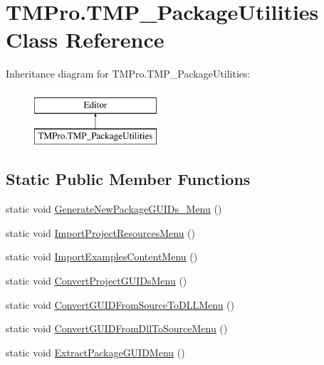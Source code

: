 \hypertarget{class_t_m_pro_1_1_t_m_p___package_utilities}{}\section{T\+M\+Pro.\+T\+M\+P\+\_\+\+Package\+Utilities Class Reference}
\label{class_t_m_pro_1_1_t_m_p___package_utilities}
Inheritance diagram for T\+M\+Pro.\+T\+M\+P\+\_\+\+Package\+Utilities\+:\begin{figure}[H]
\begin{center}
\leavevmode
\includegraphics[height=2.000000cm]{class_t_m_pro_1_1_t_m_p___package_utilities}
\end{center}
\end{figure}
\subsection*{Static Public Member Functions}
\begin{DoxyCompactItemize}
\item 
static void \mbox{\hyperlink{class_t_m_pro_1_1_t_m_p___package_utilities_ac893fee8fe15aa046c7d590006bbbdb8}{Generate\+New\+Package\+G\+U\+I\+Ds\+\_\+\+Menu}} ()
\item 
static void \mbox{\hyperlink{class_t_m_pro_1_1_t_m_p___package_utilities_a11f7e20b4617d90a5f1da630ed02b0dd}{Import\+Project\+Resources\+Menu}} ()
\item 
static void \mbox{\hyperlink{class_t_m_pro_1_1_t_m_p___package_utilities_aa73bd06e0ec78098db6c2d895bf8412e}{Import\+Examples\+Content\+Menu}} ()
\item 
static void \mbox{\hyperlink{class_t_m_pro_1_1_t_m_p___package_utilities_a049f2aee85c729a36286c8f57ed14a65}{Convert\+Project\+G\+U\+I\+Ds\+Menu}} ()
\item 
static void \mbox{\hyperlink{class_t_m_pro_1_1_t_m_p___package_utilities_a04787a4fc933d24280f8daf104208d39}{Convert\+G\+U\+I\+D\+From\+Source\+To\+D\+L\+L\+Menu}} ()
\item 
static void \mbox{\hyperlink{class_t_m_pro_1_1_t_m_p___package_utilities_a9ca977a668368d564883e9c34b261cb0}{Convert\+G\+U\+I\+D\+From\+Dll\+To\+Source\+Menu}} ()
\item 
static void \mbox{\hyperlink{class_t_m_pro_1_1_t_m_p___package_utilities_a1504406c8d99b0d9653f24596ac8f1f5}{Extract\+Package\+G\+U\+I\+D\+Menu}} ()
\end{DoxyCompactItemize}


